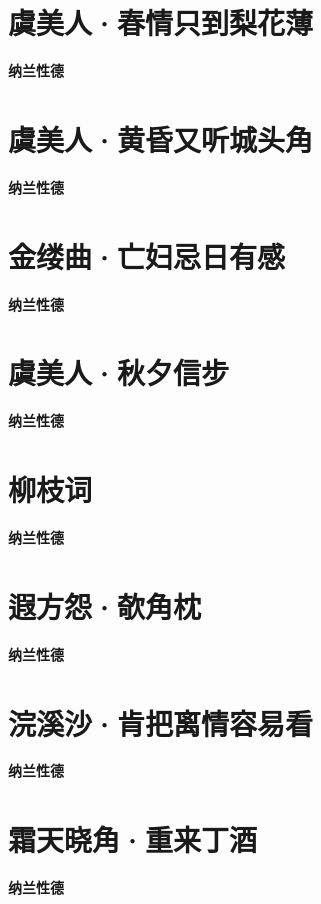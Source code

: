 \documentclass[12pt,a4paper]{ctexbook}
\begin{document}
\section{虞美人·春情只到梨花薄}
\textbf{纳兰性德}\par\vspace{0.5em}

\section{虞美人·黄昏又听城头角}
\textbf{纳兰性德}\par\vspace{0.5em}

\section{金缕曲·亡妇忌日有感}
\textbf{纳兰性德}\par\vspace{0.5em}

\section{虞美人·秋夕信步}
\textbf{纳兰性德}\par\vspace{0.5em}

\section{柳枝词}
\textbf{纳兰性德}\par\vspace{0.5em}

\section{遐方怨·欹角枕}
\textbf{纳兰性德}\par\vspace{0.5em}

\section{浣溪沙·肯把离情容易看}
\textbf{纳兰性德}\par\vspace{0.5em}

\section{霜天晓角·重来丁酒}
\textbf{纳兰性德}\par\vspace{0.5em}
\end{document}
